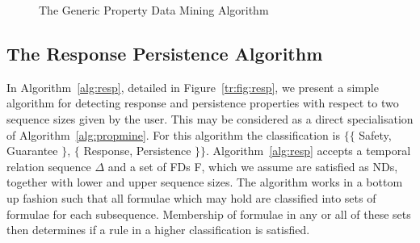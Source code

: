 {\line
\begin{figure}[ht]
\begin{center}
\caption{\label{tr:fig:propmine} The Generic Property Data Mining Algorithm}
\end{center}
\end{figure}
}



\subsection{The Response Persistence Algorithm}\label{subsec:tr_resppers}


In Algorithm~\ref{alg:resp}, detailed in Figure~\ref{tr:fig:resp}, we
present a simple algorithm for detecting response and persistence
properties with respect to two sequence sizes given by the user. This
may be considered as a direct specialisation of
Algorithm~\ref{alg:propmine}. For this algorithm the classification is
$\{ \{$ Safety, Guarantee $\}$, $\{$ Response, Persistence $\} \}$.
Algorithm~\ref{alg:resp} accepts a temporal relation sequence $\Delta$
and a set of FDs F, which we assume are satisfied as NDs, together
with lower and upper sequence sizes. The algorithm works in a bottom up
fashion such that all formulae which may hold are classified into
sets of formulae for each subsequence. Membership of formulae in any
or all of these sets then determines if a rule in a higher
classification is satisfied.

